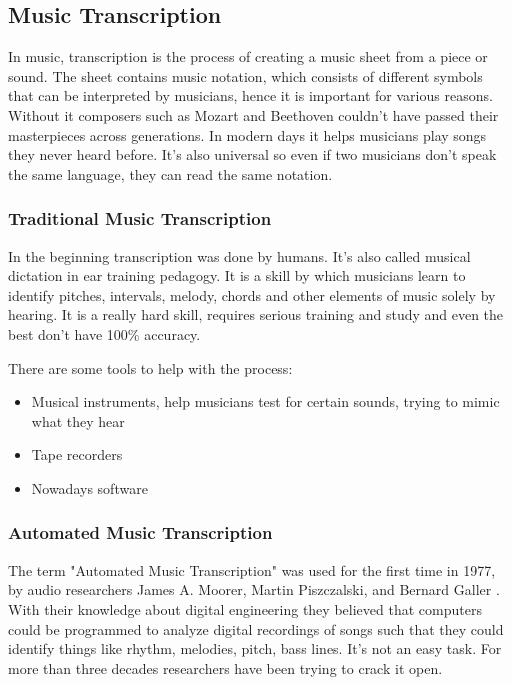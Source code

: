 \subsection{Music Transcription}
In music, transcription is the process of creating a music sheet from a piece or sound. The sheet contains music notation, which consists of different symbols that can be interpreted by musicians, hence it is important for various reasons. Without it composers such as Mozart and Beethoven couldn't have passed their masterpieces across generations. In modern days it helps musicians play songs they never heard before. It's also universal so even if two musicians don't speak the same language, they can read the same notation.

\subsubsection{Traditional Music Transcription}
In the beginning transcription was done by humans. It's also called musical dictation in ear training pedagogy. \cite{human_transcription} It is a skill by which musicians learn to identify pitches, intervals, melody, chords and other elements of music solely by hearing. It is a really hard skill, requires serious training and study and even the best don't have 100\% accuracy. \par

There are some tools to help with the process:
\begin{itemize}
	\item Musical instruments, help musicians test for certain sounds, trying to mimic what they hear
	\item Tape recorders
	\item Nowadays software
\end{itemize}

\subsubsection{Automated Music Transcription}
The term "Automated Music Transcription" was used for the first time in 1977, by audio researchers James A. Moorer, Martin Piszczalski, and Bernard Galler \cite{transcription}. With their knowledge about digital engineering they believed that computers could be programmed to analyze digital recordings of songs such that they could identify things like rhythm, melodies, pitch, bass lines. It's not an easy task. For more than three decades researchers have been trying to crack it open. \par

